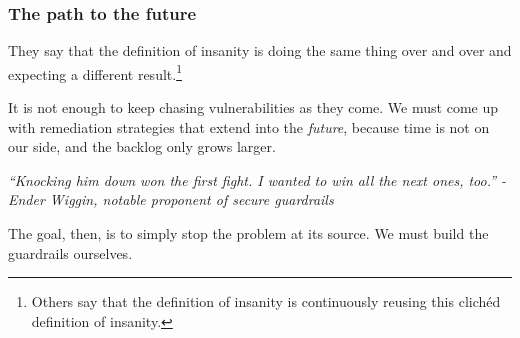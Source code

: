 \documentclass[aspectratio=169, handout]{beamer}
\begin{document}
\begin{frame}[fragile]
  \frametitle{The path to the future}

  They say that the definition of insanity is doing the same thing over and over and
  expecting a different result.\footnote{Others say that the definition of insanity
  is continuously reusing this clichéd definition of insanity.}

  \pause
  \vspace{5pt}

  It is not enough to keep chasing vulnerabilities as they come. We must come up
  with remediation strategies that extend into the \textit{future}, because time
  is not on our side, and the backlog only grows larger.


  \pause
  \vspace{5pt}

  \begin{center}
    \textit{``Knocking him down won the first fight. I wanted to win all the next ones, too.'' - Ender Wiggin, notable proponent of secure guardrails}
  \end{center}


  \pause
  \vspace{5pt}

  The goal, then, is to simply stop the problem at its source. We must
  build the guardrails ourselves.

\end{frame}


\end{document}
